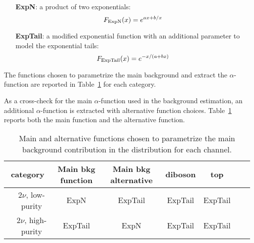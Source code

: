 \begin{itemize}
  \item[{\bf ExpN}:] a product of two exponentials: $$F_{\rm ExpN}(x) = e^{ax+b/x}$$
  \item[{\bf ExpTail}:] a modified exponential function with an additional parameter to model the exponential tails: $$F_{\rm ExpTail}(x) = e^{-x/(a+bx)}$$
\end{itemize}

The functions chosen to parametrize the main background and extract the $\alpha$-function are reported in Table~\ref{tab:XMassFunctions} for each category.

As a cross-check for the main $\alpha$-function used in the background estimation, an additional $\alpha$-function is extracted with alternative function choices. Table~\ref{tab:XMassFunctions} reports both the main function and the alternative function.

\begin{table}[!htb]
  \begin{center}
    \begin{tabular}{cc|cccccc}
      \multicolumn{2}{c}{category} & Main bkg function & Main bkg alternative & diboson & top \\
      \hline
       & $2\nu$, low-purity  & ExpN & ExpTail & ExpTail & ExpTail \\
      \hline
       & $2\nu$, high-purity  & ExpTail & ExpN & ExpTail & ExpTail \\
      \hline
    \end{tabular}
  \end{center}
  \caption{Main and alternative functions chosen to parametrize the main background contribution in the \mtVZ distribution for each channel.}\label{tab:XMassFunctions}
\end{table}



